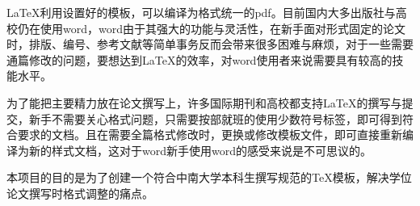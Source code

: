 \begin{abstractcn}
LaTeX利用设置好的模板，可以编译为格式统一的pdf。目前国内大多出版社与高校仍在使用word，word由于其强大的功能与灵活性，在新手面对形式固定的论文时，排版、编号、参考文献等简单事务反而会带来很多困难与麻烦，对于一些需要通篇修改的问题，要想达到LaTeX的效率，对word使用者来说需要具有较高的技能水平。

为了能把主要精力放在论文撰写上，许多国际期刊和高校都支持LaTeX的撰写与提交，新手不需要关心格式问题，只需要按部就班的使用少数符号标签，即可得到符合要求的文档。且在需要全篇格式修改时，更换或修改模板文件，即可直接重新编译为新的样式文档，这对于word新手使用word的感受来说是不可思议的。

本项目的目的是为了创建一个符合中南大学本科生撰写规范的TeX模板，解决学位论文撰写时格式调整的痛点。


\end{abstractcn}